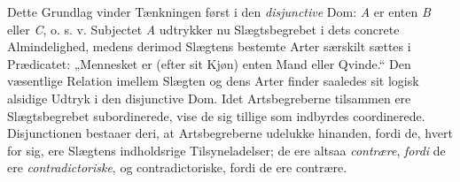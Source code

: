 \documentclass[12pt]{book}
\begin{document}
Dette Grundlag vinder Tænkningen først i den \emph{disjunctive} Dom: \textit{A}
er enten \textit{B} eller \textit{C}, o. s. v. Subjectet \textit{A} udtrykker nu
Slægtsbegrebet i dets concrete Almindelighed, medens derimod Slægtens bestemte
Arter særskilt sættes i Prædicatet: „Mennesket er (efter sit Kjøn) enten Mand
eller Qvinde.“ Den væsentlige Relation imellem Slægten og dens Arter finder
saaledes sit logisk alsidige Udtryk i den disjunctive Dom. Idet Artsbegreberne
tilsammen ere Slægtsbegrebet subordinerede, vise de sig tillige som indbyrdes
coordinerede. Disjunctionen bestaaer deri, at Artsbegreberne udelukke hinanden,
fordi de, hvert for sig, ere Slægtens indholdsrige Tilsyneladelser; de ere
altsaa \emph{contrære}, \emph{fordi} de ere \emph{contradictoriske}, og
contradictoriske, fordi de ere contrære.
\end{document}

